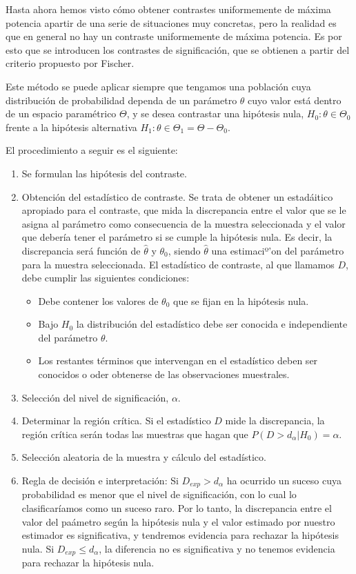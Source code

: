 Hasta ahora hemos visto c\'omo obtener contrastes uniformemente de m\'axima potencia  apartir de una serie de situaciones muy concretas, pero la realidad es que en general no hay un contraste uniformemente de m\'axima potencia. Es por esto que se introducen los contrastes de significaci\'on, que se obtienen a partir del criterio propuesto por Fischer.

Este m\'etodo se puede aplicar siempre que tengamos una poblaci\'on cuya distribuci\'on de probabilidad dependa de un par\'ametro $\theta$ cuyo valor est\'a dentro de un espacio param\'etrico $\Theta$, y se desea contrastar una hip\'otesis nula, $H_0:\theta\in\Theta_0$ frente a la hip\'otesis alternativa $H_1:\theta\in\Theta_1=\Theta-\Theta_0$.

El procedimiento a seguir es el siguiente:

\begin{enumerate}
\item Se formulan las hip\'otesis del contraste.
\item Obtenci\'on del estad\'istico de contraste. Se trata de obtener un estad\'aitico apropiado para el contraste, que mida la discrepancia entre el valor que se le asigna al par\'ametro como consecuencia de la muestra seleccionada y el valor que deber\'ia tener el par\'ametro si se cumple la hip\'otesis nula. Es decir, la discrepancia ser\'a funci\'on de $\hat{\theta}$ y $\theta_0$, siendo $\hat{\theta}$ una estimaciº'on del par\'ametro para la muestra seleccionada. El estad\'istico de contraste, al que llamamos $D$, debe cumplir las siguientes condiciones:
\begin{itemize}
\item Debe contener los valores de $\theta_0$ que se fijan en la hip\'otesis nula.
\item Bajo $H_0$ la distribuci\'on del estad\'istico debe ser conocida e independiente del par\'ametro $\theta$.
\item Los restantes t\'erminos que intervengan en el estad\'istico deben ser conocidos o oder obtenerse de las observaciones muestrales.
\end{itemize}
\item Selecci\'on del nivel de significaci\'on, $\alpha$.
\item Determinar la regi\'on cr\'itica. Si el estad\'istico $D$ mide la discrepancia, la regi\'on cr\'itica ser\'an todas las muestras que hagan que $P(D>d_{\alpha}|H_0)=\alpha$.
\item Selecci\'on aleatoria de la muestra y c\'alculo del estad\'istico.
\item Regla de decisi\'on e interpretaci\'on: Si $D_{exp}>d_\alpha$ ha ocurrido un suceso cuya probabilidad es menor que el nivel de significaci\'on, con lo cual lo clasificar\'iamos como un suceso raro. Por lo tanto, la discrepancia entre el valor del pa\'ametro seg\'un la hip\'otesis nula y el valor estimado por nuestro estimador es significativa, y tendremos evidencia para rechazar la hip\'otesis nula. Si $D_{exp}\leq d_\alpha$, la diferencia no es significativa y no tenemos evidencia para rechazar la hip\'otesis nula.
\end{enumerate}

